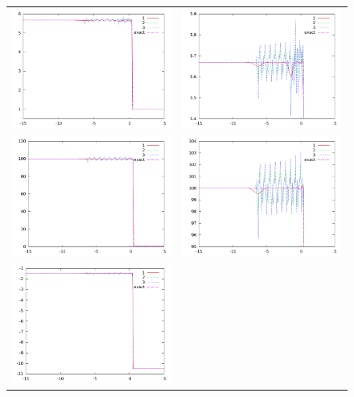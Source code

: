\documentclass[10pt,preprint]{aastex}
\begin{document}
\begin{figure}[h]
  \begin{center}
	\begin{tabular}{cc}
      \includegraphics[width=.4\textwidth]{den_T11.png} &
	  \includegraphics[width=.4\textwidth]{den11zoom.png} \\
	  \includegraphics[width=.4\textwidth]{prs_T11.png} &	
	  \includegraphics[width=.4\textwidth]{prs11zoom.png} \\
      \includegraphics[width=.4\textwidth]{vel_T11.png} &	

\end{tabular}
\end{center}
\end{figure}
\end{document}
